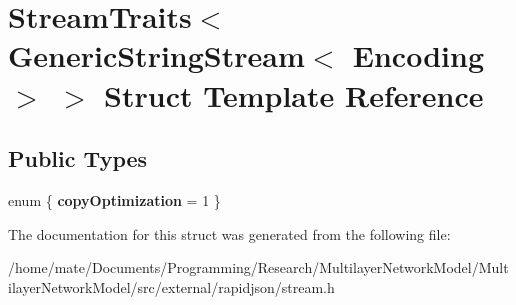 \hypertarget{structStreamTraits_3_01GenericStringStream_3_01Encoding_01_4_01_4}{}\section{Stream\+Traits$<$ Generic\+String\+Stream$<$ Encoding $>$ $>$ Struct Template Reference}
\label{structStreamTraits_3_01GenericStringStream_3_01Encoding_01_4_01_4}
\subsection*{Public Types}
\begin{DoxyCompactItemize}
\item 
enum \{ {\bfseries copy\+Optimization} = 1
 \}\hypertarget{structStreamTraits_3_01GenericStringStream_3_01Encoding_01_4_01_4_a36081c50934bef71843a4d351a98612e}{}\label{structStreamTraits_3_01GenericStringStream_3_01Encoding_01_4_01_4_a36081c50934bef71843a4d351a98612e}

\end{DoxyCompactItemize}


The documentation for this struct was generated from the following file\+:\begin{DoxyCompactItemize}
\item 
/home/mate/\+Documents/\+Programming/\+Research/\+Multilayer\+Network\+Model/\+Multilayer\+Network\+Model/src/external/rapidjson/stream.\+h\end{DoxyCompactItemize}
